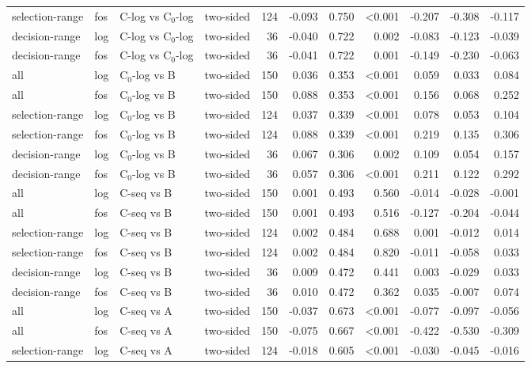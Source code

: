\begin{longtable}{llllrrrrrrr}
selection-range & fos & C-log vs C$_0$-log & two-sided & 124 & -0.093 & 0.750 & <0.001 & -0.207 & -0.308 & -0.117 \\
decision-range & log & C-log vs C$_0$-log & two-sided & 36 & -0.040 & 0.722 & 0.002 & -0.083 & -0.123 & -0.039 \\
decision-range & fos & C-log vs C$_0$-log & two-sided & 36 & -0.041 & 0.722 & 0.001 & -0.149 & -0.230 & -0.063 \\
all & log & C$_0$-log vs B & two-sided & 150 & 0.036 & 0.353 & <0.001 & 0.059 & 0.033 & 0.084 \\
all & fos & C$_0$-log vs B & two-sided & 150 & 0.088 & 0.353 & <0.001 & 0.156 & 0.068 & 0.252 \\
selection-range & log & C$_0$-log vs B & two-sided & 124 & 0.037 & 0.339 & <0.001 & 0.078 & 0.053 & 0.104 \\
selection-range & fos & C$_0$-log vs B & two-sided & 124 & 0.088 & 0.339 & <0.001 & 0.219 & 0.135 & 0.306 \\
decision-range & log & C$_0$-log vs B & two-sided & 36 & 0.067 & 0.306 & 0.002 & 0.109 & 0.054 & 0.157 \\
decision-range & fos & C$_0$-log vs B & two-sided & 36 & 0.057 & 0.306 & <0.001 & 0.211 & 0.122 & 0.292 \\
all & log & C-seq vs B & two-sided & 150 & 0.001 & 0.493 & 0.560 & -0.014 & -0.028 & -0.001 \\
all & fos & C-seq vs B & two-sided & 150 & 0.001 & 0.493 & 0.516 & -0.127 & -0.204 & -0.044 \\
selection-range & log & C-seq vs B & two-sided & 124 & 0.002 & 0.484 & 0.688 & 0.001 & -0.012 & 0.014 \\
selection-range & fos & C-seq vs B & two-sided & 124 & 0.002 & 0.484 & 0.820 & -0.011 & -0.058 & 0.033 \\
decision-range & log & C-seq vs B & two-sided & 36 & 0.009 & 0.472 & 0.441 & 0.003 & -0.029 & 0.033 \\
decision-range & fos & C-seq vs B & two-sided & 36 & 0.010 & 0.472 & 0.362 & 0.035 & -0.007 & 0.074 \\
all & log & C-seq vs A & two-sided & 150 & -0.037 & 0.673 & <0.001 & -0.077 & -0.097 & -0.056 \\
all & fos & C-seq vs A & two-sided & 150 & -0.075 & 0.667 & <0.001 & -0.422 & -0.530 & -0.309 \\
selection-range & log & C-seq vs A & two-sided & 124 & -0.018 & 0.605 & <0.001 & -0.030 & -0.045 & -0.016 \\

\end{longtable}
